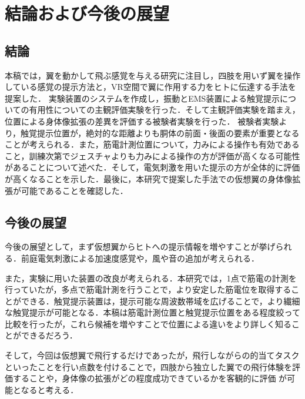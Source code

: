 \chapter[結論および今後の展望]%
        {結論および今後の展望}

\section{結論}
    本稿では，翼を動かして飛ぶ感覚を与える研究に注目し，四肢を用いず翼を操作している感覚の提示方法と，VR空間で翼に作用する力をヒトに伝達する手法を提案した．
    実験装置のシステムを作成し，振動とEMS装置による触覚提示についての有用性についての主観評価実験を行った．そして主観評価実験を踏まえ，位置による身体像拡張の差異を評価する被験者実験を行った．
    被験者実験より，触覚提示位置が，絶対的な距離よりも胴体の前面・後面の要素が重要となることが考えられる．また，筋電計測位置について，力みによる操作も有効であること，訓練次第でジェスチャよりも力みによる操作の方が評価が高くなる可能性があることについて述べた．そして，電気刺激を用いた提示の方が全体的に評価が高くなることを示した．最後に，本研究で提案した手法での仮想翼の身体像拡張が可能であることを確認した．

    
\section{今後の展望}
    今後の展望として，まず仮想翼からヒトへの提示情報を増やすことが挙げられる．前庭電気刺激による加速度感覚\cite{maeda2005shaking}\cite{青山一真2014前庭電気刺激における逆方向不感電流を用いた加速度感覚の増強}や，風や音の追加が考えられる．

    また，実験に用いた装置の改良が考えられる．本研究では，1点で筋電の計測を行っていたが，多点で筋電計測を行うことで，より安定した筋電位を取得することができる\cite{白石恵1992筋電位多点計測による体幹背部の神経支配帯の分布}．触覚提示装置は，提示可能な周波数帯域を広げることで，より繊細な触覚提示が可能となる．本稿は筋電計測位置と触覚提示位置をある程度絞って比較を行ったが，これら候補を増やすことで位置による違いをより詳しく知ることができるだろう．

    そして，今回は仮想翼で飛行するだけであったが，飛行しながらの的当てタスクといったことを行い点数を付けることで，四肢から独立した翼での飛行体験を評価することや，身体像の拡張がどの程度成功できているかを客観的に評価
    が可能となると考える．
  
